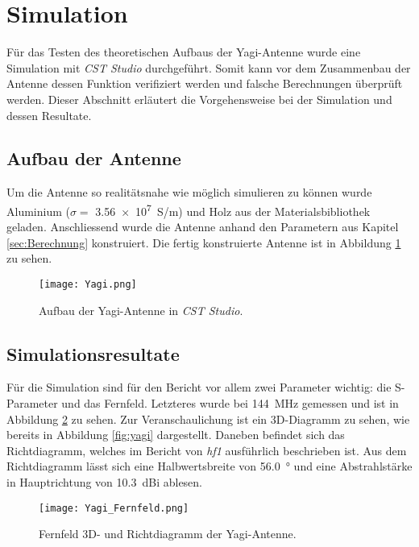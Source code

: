 \section{Simulation}\label{sec:Simulationsresultate}

Für das Testen des theoretischen Aufbaus der Yagi-Antenne wurde eine Simulation mit \textit{CST Studio} durchgeführt. Somit kann vor dem Zusammenbau der Antenne dessen Funktion verifiziert werden und falsche Berechnungen überprüft werden. Dieser Abschnitt erläutert die Vorgehensweise bei der Simulation und dessen Resultate.

\subsection{Aufbau der Antenne}

Um die Antenne so realitätsnahe wie möglich simulieren zu können wurde Aluminium ($\sigma = $ \SI{3.56e+7}{S/m}) und Holz aus der Materialsbibliothek geladen. Anschliessend wurde die Antenne anhand den Parametern aus Kapitel \ref{sec:Berechnung} konstruiert. Die fertig konstruierte Antenne ist in Abbildung \ref{fig:Simulation_Yagi} zu sehen.

\begin{figure}[h!]
	\centering
	\texttt{[image: Yagi.png]}
	\caption{Aufbau der Yagi-Antenne in \textit{CST Studio}.}
	\label{fig:Simulation_Yagi}
\end{figure}

\subsection{Simulationsresultate}

Für die Simulation sind für den Bericht vor allem zwei Parameter wichtig: die S-Parameter und das Fernfeld. Letzteres wurde bei \SI{144}{MHz} gemessen und ist in Abbildung \ref{fig:Simulation_Yagi_Fernfeld} zu sehen. Zur Veranschaulichung ist ein 3D-Diagramm zu sehen, wie bereits in Abbildung \ref{fig:yagi} dargestellt. Daneben befindet sich das Richtdiagramm, welches im Bericht von \textit{hf1} ausführlich beschrieben ist. Aus dem Richtdiagramm lässt sich eine Halbwertsbreite von \SI{56.0}{\degree} und eine Abstrahlstärke in Hauptrichtung von \SI{10.3}{dBi} ablesen.

 \newpage

\begin{figure}[h!]
	\centering
	\texttt{[image: Yagi\_Fernfeld.png]}
	\caption{Fernfeld 3D- und Richtdiagramm der Yagi-Antenne.}
	\label{fig:Simulation_Yagi_Fernfeld}
\end{figure}


